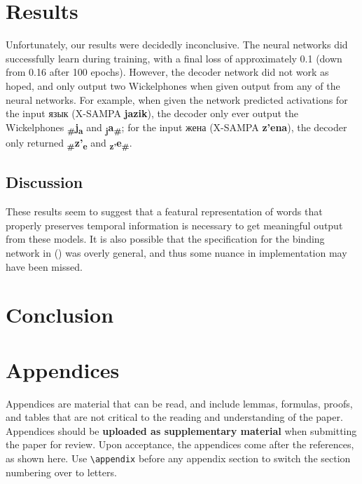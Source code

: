 \documentclass[11pt,a4paper]{article}
\newcommand{\citenp}[1]{\citeauthor{#1} (\citeyear{#1})}
\begin{document}
\section{Results}
Unfortunately, our results were decidedly inconclusive.
The neural networks did successfully learn during training,
with a final loss of approximately 0.1 (down from 0.16 after 100 epochs).
However, the decoder network did not work as hoped, and only output two Wickelphones
when given output from any of the neural networks. For example, when given the network predicted activations
for the input \foreignlanguage{russian}{язык} (X-SAMPA \textbf{jazik}), the decoder only ever output
the Wickelphones \textbf{\textsubscript{\#}j\textsubscript{a}} and \textbf{\textsubscript{j}a\textsubscript{\#}};
for the input \foreignlanguage{russian}{жена} (X-SAMPA \textbf{z'ena}), the decoder only returned \textbf{\textsubscript{\#}z'\textsubscript{e}} and \textbf{\textsubscript{z'}e\textsubscript{\#}}.


\subsection{Discussion}
These results seem to suggest that a featural representation of words that properly preserves temporal
information is necessary to get meaningful output from these models. It is also possible that the
specification for the binding network in \citenp{RMcC} was overly general, and thus some nuance in implementation
may have been missed.

\section{Conclusion}

{}


\appendix

\section{Appendices}
\label{sec:appendix}
Appendices are material that can be read, and include lemmas, formulas, proofs, and tables that are not critical to the reading and understanding of the paper. 
Appendices should be \textbf{uploaded as supplementary material} when submitting the paper for review. Upon acceptance, the appendices come after the references, as shown here. Use
\verb|\appendix| before any appendix section to switch the section
numbering over to letters. 
\end{document}
